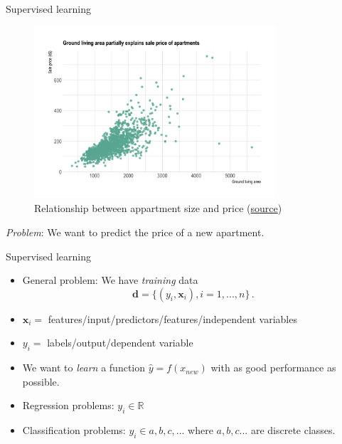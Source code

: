 \documentclass[10pt]{beamer}
\begin{document}
\begin{frame}{Supervised learning}

\begin{figure}[h]
\caption{Relationship between appartment size and price (\href{https://www.data-to-viz.com/story/TwoNum.html}{source})}
\centering
\includegraphics[width=0.8\textwidth]{figs/scatter_apartment.png}
\end{figure}

\emph{Problem}: We want to predict the price of a new apartment.

\end{frame}



\begin{frame}{Supervised learning}

\begin{itemize}
\item General problem: We have \emph{training} data
\[
\mathbf{d} = \{(y_i, \mathbf{x}_i), i = 1, ..., n\} \,.
\]
\item $\mathbf{x}_i = $ features/input/predictors/features/independent variables
\item $y_i = $ labels/output/dependent variable
\item We want to \emph{learn} a function $\hat{y} = f(x_{new})$ with as good performance as possible.\pause
\item Regression problems: $y_i \in \mathbb{R}$
\item Classification problems: $y_i \in {a,b,c,...}$ where $a,b,c ...$ are discrete classes.
\end{itemize}

\end{frame}
\end{document}
